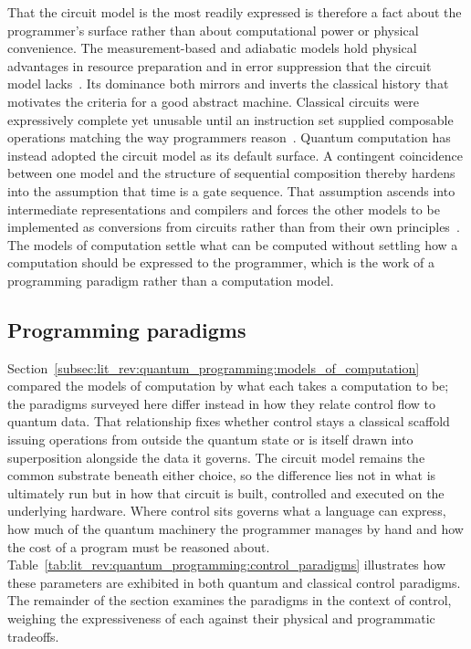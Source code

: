 That the circuit model is the most readily expressed is therefore a fact about the programmer's surface rather than about computational power or physical convenience.
The measurement-based and adiabatic models hold physical advantages in resource preparation and in error suppression that the circuit model lacks~\cite{raussendorf2001oneway, aharonov2007adiabatic}.
Its dominance both mirrors and inverts the classical history that motivates the criteria for a good abstract machine.
Classical circuits were expressively complete yet unusable until an instruction set supplied composable operations matching the way programmers reason~\cite{nunez_corrales2025betterabstractmachines}.
Quantum computation has instead adopted the circuit model as its default surface.
A contingent coincidence between one model and the structure of sequential composition thereby hardens into the assumption that time is a gate sequence.
That assumption ascends into intermediate representations and compilers and forces the other models to be implemented as conversions from circuits rather than from their own principles~\cite{aharonov2007adiabatic}.
The models of computation settle what can be computed without settling how a computation should be expressed to the programmer, which is the work of a programming paradigm rather than a computation model.

\subsection{Programming paradigms}\label{subsec:lit_rev:quantum_programming:programming_paradigms}

Section~\ref{subsec:lit_rev:quantum_programming:models_of_computation} compared the models of computation by what each takes a computation to be; the paradigms surveyed here differ instead in how they relate control flow to quantum data.
That relationship fixes whether control stays a classical scaffold issuing operations from outside the quantum state or is itself drawn into superposition alongside the data it governs.
The circuit model remains the common substrate beneath either choice, so the difference lies not in what is ultimately run but in how that circuit is built, controlled and executed on the underlying hardware.
Where control sits governs what a language can express, how much of the quantum machinery the programmer manages by hand and how the cost of a program must be reasoned about.
Table~\ref{tab:lit_rev:quantum_programming:control_paradigms} illustrates how these parameters are exhibited in both quantum and classical control paradigms.
The remainder of the section examines the paradigms in the context of control, weighing the expressiveness of each against their physical and programmatic tradeoffs.

